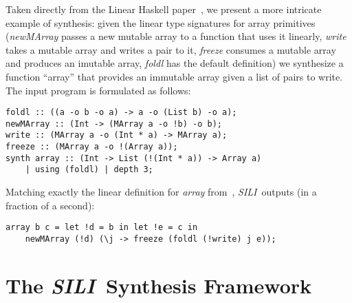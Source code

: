 \documentclass{llncs}
\newcommand{\synname}{\emph{SILI}}
\begin{document}
Taken directly from the Linear Haskell paper~\cite{Bernardy_2018}, we present a
more intricate example of synthesis: given the linear type signatures for array
primitives (\emph{newMArray} passes a new mutable array to a function that uses
it linearly, \emph{write} takes a mutable array and writes a pair to it,
\emph{freeze} consumes a mutable array and produces an imutable array,
\emph{foldl} has the default definition) we synthesize a function
``array'' that provides an immutable array given a list of pairs to write. The input program is formulated as
follows:
%
\begin{verbatim}
foldl :: ((a -o b -o a) -> a -o (List b) -o a);
newMArray :: (Int -> (MArray a -o !b) -o b);
write :: (MArray a -o (Int * a) -> MArray a);
freeze :: (MArray a -o !(Array a));
synth array :: (Int -> List (!(Int * a)) -> Array a)
    | using (foldl) | depth 3;
\end{verbatim}
%
Matching exactly the linear definition for
\emph{array} from~\cite{Bernardy_2018}, \synname\
outputs (in a fraction of a second):
%
\begin{verbatim}
array b c = let !d = b in let !e = c in
    newMArray (!d) (\j -> freeze (foldl (!write) j e));
\end{verbatim}

\section{The \synname\ Synthesis Framework}\label{sec:formal_system}


\end{document}
